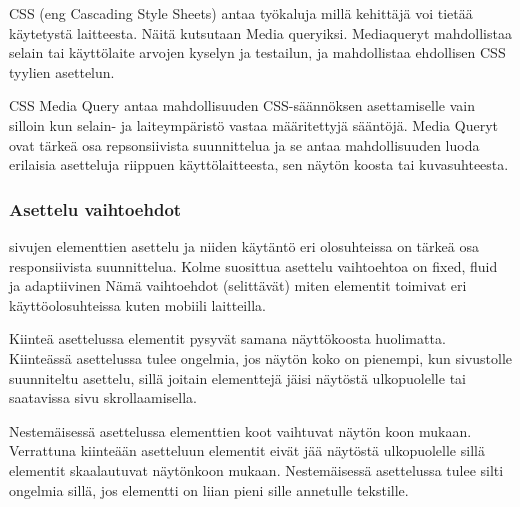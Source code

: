 \documentclass[11pt,a4paper,titlepage,oneside]{article}
\begin{document}
CSS (eng Cascading Style Sheets) antaa työkaluja millä kehittäjä voi tietää käytetystä laitteesta.
Näitä kutsutaan Media queryiksi.
Mediaqueryt mahdollistaa selain tai käyttölaite arvojen kyselyn ja testailun, ja mahdollistaa ehdollisen CSS tyylien asettelun.

\medskip





CSS Media Query antaa mahdollisuuden CSS-säännöksen asettamiselle vain silloin kun selain- ja laiteympäristö vastaa määritettyjä sääntöjä. 
Media Queryt ovat tärkeä osa repsonsiivista suunnittelua ja se antaa mahdollisuuden luoda erilaisia asetteluja riippuen käyttölaitteesta,
sen näytön koosta tai kuvasuhteesta.












\subsubsection{Asettelu vaihtoehdot}





sivujen elementtien asettelu ja niiden käytäntö eri olosuhteissa on tärkeä osa responsiivista suunnittelua.
Kolme suosittua asettelu vaihtoehtoa on fixed, fluid ja adaptiivinen
Nämä vaihtoehdot (selittävät) miten elementit toimivat eri käyttöolosuhteissa kuten mobiili laitteilla.
\medskip



Kiinteä asettelussa elementit pysyvät samana näyttökoosta huolimatta. 
Kiinteässä asettelussa tulee ongelmia, jos näytön koko on pienempi, kun sivustolle suunniteltu asettelu, 
sillä joitain elementtejä jäisi näytöstä ulkopuolelle tai saatavissa sivu skrollaamisella.
\medskip


Nestemäisessä asettelussa elementtien koot vaihtuvat näytön koon mukaan. 
Verrattuna kiinteään asetteluun elementit eivät jää näytöstä ulkopuolelle sillä elementit skaalautuvat näytönkoon mukaan.
Nestemäisessä asettelussa tulee silti ongelmia sillä, jos elementti on liian pieni sille annetulle tekstille.
\medskip
\end{document}
